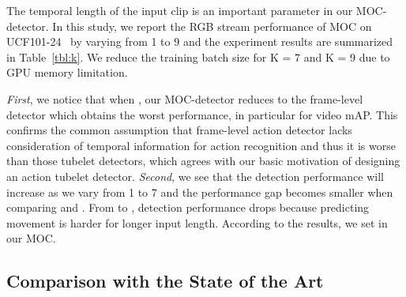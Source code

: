\documentclass[runningheads]{llncs}
\begin{document}
The temporal length  of the input clip is an important parameter in our MOC-detector. In this study, we report the RGB stream performance of MOC on UCF101-24~\cite{UCF101} by varying  from 1 to 9 and the experiment results are summarized in Table~\ref{tbl:k}. We reduce the training batch size for K = 7 and K = 9 due to GPU memory limitation.

{\em First}, we notice that when , our  MOC-detector reduces to the frame-level detector which obtains the worst performance, in particular for video mAP. This confirms the common assumption that frame-level action detector lacks consideration of temporal information for action recognition and thus it is worse than those tubelet detectors, which agrees with our basic motivation of designing an action tubelet detector. {\em Second}, we see that the detection performance will increase as we vary  from 1 to 7 and the performance gap becomes smaller when comparing  and . From  to , detection performance drops because predicting movement is harder for longer input length.  According to the results, we set  in our MOC.

\subsection{Comparison with the State of the Art}\label{SOTA}
\end{document}
